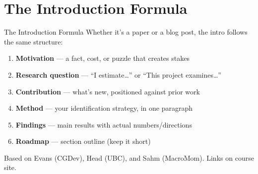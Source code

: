 \section{The Introduction Formula}

\begin{frame}{The Introduction Formula}
  Whether it's a paper or a blog post, the intro follows the same structure:

  \vspace{8pt}

  \begin{enumerate}
    \item \textbf{Motivation} --- a fact, cost, or puzzle that creates stakes
    \item \textbf{Research question} --- ``I estimate\ldots'' or ``This project examines\ldots''
    \item \textbf{Contribution} --- what's new, positioned against prior work
    \item \textbf{Method} --- your identification strategy, in one paragraph
    \item \textbf{Findings} --- main results with actual numbers/directions
    \item \textbf{Roadmap} --- section outline (keep it short)
  \end{enumerate}

  \vspace{8pt}

  {\scriptsize Based on Evans (CGDev), Head (UBC), and Sahm (MacroMom). Links on course site.}
\end{frame}

